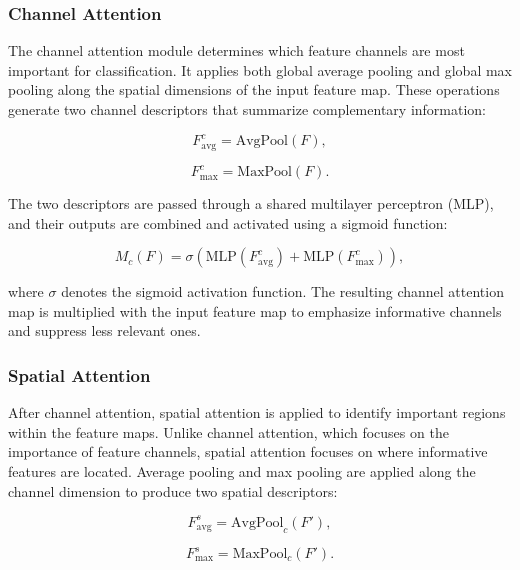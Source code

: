\subsubsection{Channel Attention}

The channel attention module determines which feature channels are most important for classification. It applies both global average pooling and global max pooling along the spatial dimensions of the input feature map. These operations generate two channel descriptors that summarize complementary information:

\begin{equation}
    F_{\text{avg}}^{c} = \text{AvgPool}(F),
\end{equation}

\begin{equation}
    F_{\text{max}}^{c} = \text{MaxPool}(F).
\end{equation}

The two descriptors are passed through a shared multilayer perceptron (MLP), and their outputs are combined and activated using a sigmoid function:

\begin{equation}
    M_c(F) = \sigma \left( \text{MLP}(F_{\text{avg}}^{c}) + \text{MLP}(F_{\text{max}}^{c}) \right),
\end{equation}

where $\sigma$ denotes the sigmoid activation function. The resulting channel attention map is multiplied with the input feature map to emphasize informative channels and suppress less relevant ones.

\subsubsection{Spatial Attention}

After channel attention, spatial attention is applied to identify important regions within the feature maps. Unlike channel attention, which focuses on the importance of feature channels, spatial attention focuses on where informative features are located. Average pooling and max pooling are applied along the channel dimension to produce two spatial descriptors:

\begin{equation}
    F_{\text{avg}}^{s} = \text{AvgPool}_{c}(F'),
\end{equation}

\begin{equation}
    F_{\text{max}}^{s} = \text{MaxPool}_{c}(F').
\end{equation}

